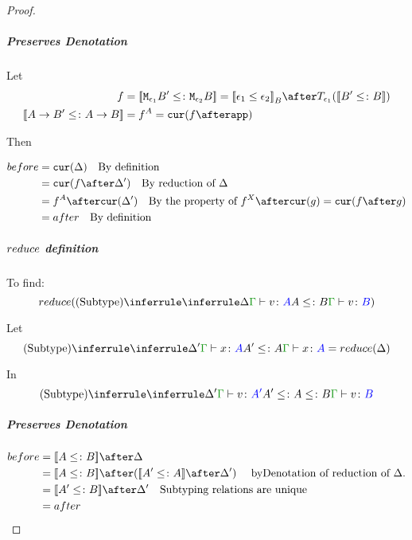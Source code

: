 \documentclass{report}
\begin{document}
\begin{framed}
\begin{proof}
                \subparagraph{Preserves Denotation}
                    Let
                    \begin{align*}
                        f &= \deno{\M{\e_1}{B'}\subtype\M{\e_2}{B}} = \deno{\e_1\subeffect\e_2}_B\after\T{\e_1}{(\deno{B'\subtype B})} \\
                        \deno{\fntype{A}{B'}\subtype\ab} & = f^A = \cur{f\after \app}
                    \end{align*}
        
                    Then
        
                    \begin{align*}
                        before & = \cur{\D} \qt{By definition}\\
                                & = \cur{f\after\D'} \qt{By reduction of $\D$} \\
                                & = f^A\after\cur{\D'}\qt{By the property of $f^X\after\cur{g} = \cur{f\after g}$} \\
                                & = after \qt{By definition}\\
                    \end{align*}
        
                \subparagraph{$reduce$ definition}
                To find:
                \begin{equation}
                    \reduce(\ntreeruleII{Subtype}{\treeruleI{\D}{\gtyperelation{v}{A}}}{ A \subtype B}{\gtyperelation{v}{B}})
                \end{equation}
        
                Let 
                \begin{equation}\label{SubtypeDeltaReduction}
                    \ntreeruleII{Subtype}{\treeruleI{\D'}{\gtyperelation{x}{A}}}{ A'\subtype A}{\gtyperelation{x}{A}} = \reduce(\D)
                \end{equation}
        
                In 
                \begin{equation}
                    \ntreeruleII{Subtype}{
                        \treeruleI{\D'}{\gtyperelation{v}{A'}}
                    }{
                    A' \subtype A \subtype B
                    }{\gtyperelation{v}{B}}
                \end{equation}
        
                \subparagraph{Preserves Denotation}
                    \begin{align*}
                        before & = \deno{A \subtype B} \after \D \\
                        & = \deno{A \subtype B} \after (\deno{A' \subtype A} \after \D') \qt{ byDenotation of reduction of $\D$.}\\
                        & = \deno{A' \subtype B} \after \D'\qt{Subtyping relations are unique} \\
                        & = after \\
                    \end{align*}
            

\end{proof}
\end{framed}
\end{document}
